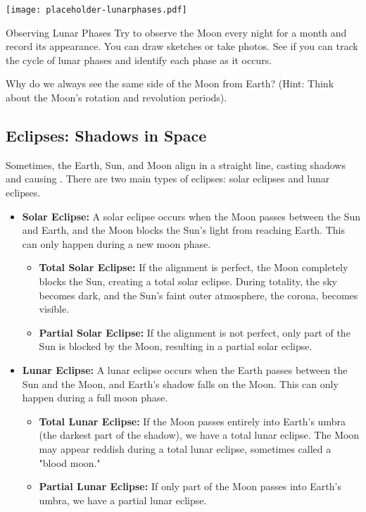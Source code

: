 \begin{marginfigure}
\texttt{[image: placeholder-lunarphases.pdf]}
\caption{\label{fig:lunarphases}Diagram illustrating the lunar phases. \textit{Image to be added.}}
\end{marginfigure}

\begin{example}{Observing Lunar Phases}
Try to observe the Moon every night for a month and record its appearance. You can draw sketches or take photos. See if you can track the cycle of lunar phases and identify each phase as it occurs.
\end{example}

\begin{stopandthink}
Why do we always see the same side of the Moon from Earth? (Hint: Think about the Moon's rotation and revolution periods).
\end{stopandthink}


\subsection{Eclipses: Shadows in Space}

Sometimes, the Earth, Sun, and Moon align in a straight line, casting shadows and causing . There are two main types of eclipses: solar eclipses and lunar eclipses.

\begin{itemize}
    \item \textbf{Solar Eclipse:} A solar eclipse occurs when the Moon passes between the Sun and Earth, and the Moon blocks the Sun's light from reaching Earth.  This can only happen during a new moon phase.
        \begin{itemize}
            \item \textbf{Total Solar Eclipse:} If the alignment is perfect, the Moon completely blocks the Sun, creating a total solar eclipse.  During totality, the sky becomes dark, and the Sun's faint outer atmosphere, the corona, becomes visible.
            \item \textbf{Partial Solar Eclipse:} If the alignment is not perfect, only part of the Sun is blocked by the Moon, resulting in a partial solar eclipse.
        \end{itemize}
    \item \textbf{Lunar Eclipse:} A lunar eclipse occurs when the Earth passes between the Sun and the Moon, and Earth's shadow falls on the Moon. This can only happen during a full moon phase.
        \begin{itemize}
            \item \textbf{Total Lunar Eclipse:} If the Moon passes entirely into Earth's umbra (the darkest part of the shadow), we have a total lunar eclipse. The Moon may appear reddish during a total lunar eclipse, sometimes called a "blood moon."
            \item \textbf{Partial Lunar Eclipse:} If only part of the Moon passes into Earth's umbra, we have a partial lunar eclipse.
        \end{itemize}
\end{itemize}

